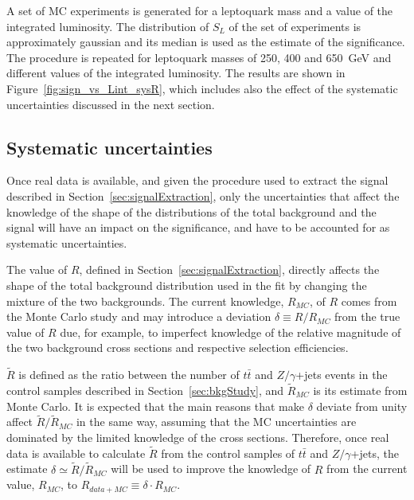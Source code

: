 \documentclass{cmspaper}
\begin{document}
\begin{linenumbers}
A set of MC experiments is generated for a leptoquark mass and a value of 
the integrated luminosity.
The distribution of $S_L$ of the set of experiments is approximately gaussian 
and its median is used as the estimate of the significance.
The procedure is repeated for leptoquark masses of 250, 400 and 650~GeV and
different values of the integrated luminosity. 
 The results are shown in
Figure~\ref{fig:sign_vs_Lint_sysR}, which includes also the effect of the systematic 
uncertainties discussed in the next section. 

\subsection{Systematic uncertainties}




Once real data is available, and given the procedure used to extract the signal described in 
Section~\ref{sec:signalExtraction},
only the uncertainties that affect the knowledge of the shape of the distributions of 
the total background and the signal will have an impact on the significance, and have to be 
accounted for as systematic uncertainties.

The value of $R$, defined in Section~\ref{sec:signalExtraction}, 
directly affects the shape of the total background distribution used in the fit by changing the
mixture of the two backgrounds. 
The current knowledge, $R_{MC}$, of $R$ comes from the Monte Carlo
study and may introduce a deviation $\delta \equiv R/R_{MC}$ from the true value of $R$
due, for example, to imperfect knowledge of the relative magnitude of the two background 
cross sections and respective selection efficiencies.

$\tilde{R}$ is defined as the ratio between the number of $t\bar{t}$ and $Z/\gamma$+jets events in the
control samples described in Section~\ref{sec:bkgStudy}, and $\tilde{R}_{MC}$ is its
estimate from Monte Carlo. It is expected that the main reasons that
make $\delta$ deviate from unity affect $\tilde{R}/\tilde{R}_{MC}$ in the same way, assuming that the MC uncertainties are
dominated by the limited knowledge of the cross sections.
Therefore, once real data is available to calculate $\tilde{R}$ from the control samples of $t\bar{t}$ and $Z/\gamma$+jets, 
the estimate $\delta \simeq \tilde{R}/\tilde{R}_{MC}$ 
will be used to improve the knowledge of $R$ from the current value, $R_{MC}$, to $R_{data+MC} \equiv \delta \cdot R_{MC}$.


\end{linenumbers}
\end{document}
